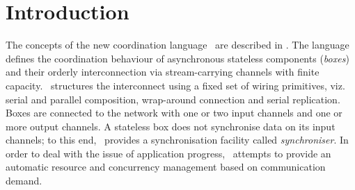 \chapter{Introduction}
%
The concepts of the new coordination language \ak\ are described in \cite{astrakahn}. The language defines the coordination behaviour of asynchronous stateless components (\emph{boxes}) and their orderly interconnection via stream-carrying channels with finite capacity. \ak\ structures the interconnect using a fixed set of wiring primitives, viz. serial and parallel composition, wrap-around connection and serial replication. Boxes are connected to the network with one or two input channels and one or more output channels. A stateless box does not synchronise data on its input channels; to this end, \ak\ provides a synchronisation facility called \emph{synchroniser}.  In order to deal with the issue of application progress, \ak\ attempts to provide an automatic resource and concurrency management based on communication demand.




